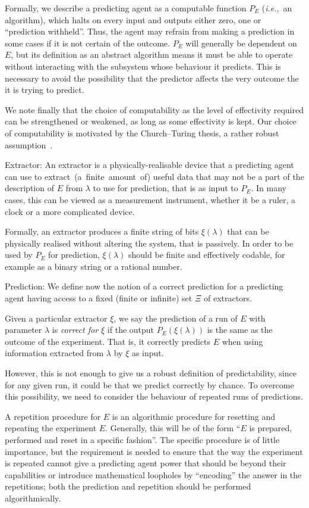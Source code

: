 \documentclass[information,article,accept,moreauthors,pdftex,12pt,a4paper]{mdpi}
\theoremstyle{mdpi}
\newcounter{thm}
\newcounter{ex}
\newcounter{re}
\theoremstyle{mdpidefinition}
\begin{document}
Formally, we describe a predicting agent as a computable function $P_E$ (\emph{i.e.},\ an algorithm), which halts on every input and outputs either zero, one or ``prediction withheld''.
Thus, the agent may refrain from making a prediction in some cases if it is not certain of the outcome.
$P_E$ will generally be dependent on $E$, but its definition as an abstract algorithm means {it must be able to operate without interacting with the subsystem whose behaviour it predicts}.
This is necessary to avoid the possibility that the predictor affects the very outcome the it is trying to predict.

We note finally that the choice of computability as the level of effectivity required can be strengthened or weakened, as long as some effectivity is kept. Our choice of computability is motivated by the Church--Turing thesis, a rather robust assumption~\cite{sep-church-turing}.


{Extractor:}
An extractor is a physically-realisable device that a predicting agent can use to \mbox{extract (a finite amount of)} useful data that may not be a part of the description of $E$ from $\lambda$ to use for prediction, that is as input to $P_E$.
In many cases, this can be viewed as a measurement instrument, whether it be a ruler, a clock or a more complicated device.

Formally, an extractor
produces a finite string of bits $\xi(\lambda)$
that can be physically realised without altering the system, that is passively.
In order to be used by $P_E$ for prediction, $\xi(\lambda)$ should be finite and effectively codable, for example as a binary string or a rational number.


{Prediction:}
We define now the notion of a correct prediction for a predicting agent having access to a fixed (finite or infinite) set $\Xi$ of extractors.

Given a particular extractor $\xi$, we say the prediction of a run of $E$ with parameter $\lambda$ is \emph{correct for $\xi$} if the output $P_E(\xi(\lambda))$ is the same as the outcome of the experiment.
That is, it correctly predicts $E$ when using information extracted from $\lambda$ by $\xi$ as input.

However, this is not enough to give us a robust definition of predictability, since for any given run, it could be that we predict correctly by chance.
To overcome this possibility, we need to consider the behaviour of repeated runs of predictions.

A {repetition procedure for $E$} is an algorithmic procedure for resetting and repeating the experiment $E$.
Generally, this will be of the form ``$E$ is prepared, performed and reset in a specific fashion''.
The specific procedure is of little importance, but the requirement is needed to ensure that the way the experiment is repeated cannot give a predicting agent power that should be beyond their capabilities or introduce mathematical loopholes by ``encoding'' the answer in the repetitions;
both the prediction and repetition should be performed algorithmically.
\end{document}
